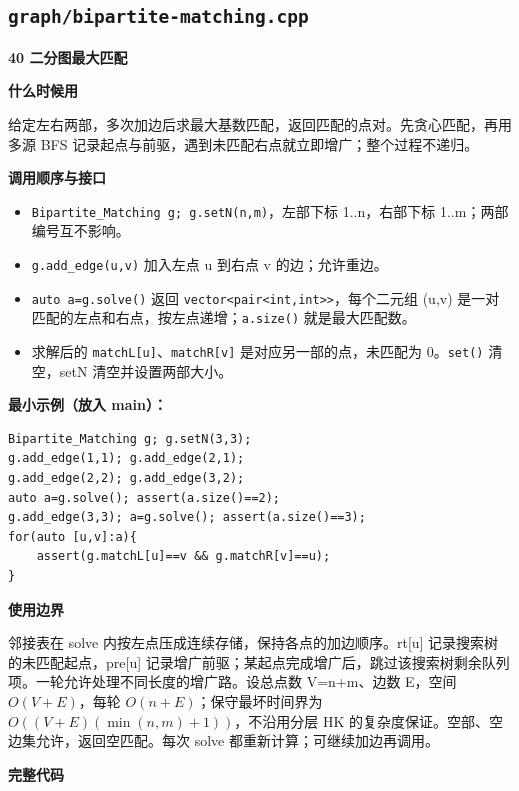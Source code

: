 \documentclass[UTF8,a4paper,10pt]{ctexart}
\newcommand{\TemplUsage}[1]{\textbf{什么时候用}\par #1\par}
\newcommand{\TemplApi}[1]{\textbf{调用顺序与接口}\par #1\par}
\newcommand{\TemplNote}[1]{\textbf{使用边界}\par #1\par}
\begin{document}
\subsection{\texttt{graph/bipartite-matching.cpp}}
\textbf{40 二分图最大匹配}

\TemplUsage{给定左右两部，多次加边后求最大基数匹配，返回匹配的点对。先贪心匹配，再用多源 BFS 记录起点与前驱，遇到未匹配右点就立即增广；整个过程不递归。}
\TemplApi{\begin{itemize}
\item \texttt{Bipartite\_Matching g; g.setN(n,m)}，左部下标 1..n，右部下标 1..m；两部编号互不影响。
\item \texttt{g.add\_edge(u,v)} 加入左点 u 到右点 v 的边；允许重边。
\item \texttt{auto a=g.solve()} 返回 \texttt{vector<pair<int,int>>}，每个二元组 (u,v) 是一对匹配的左点和右点，按左点递增；\texttt{a.size()} 就是最大匹配数。
\item 求解后的 \texttt{matchL[u]}、\texttt{matchR[v]} 是对应另一部的点，未匹配为 0。\texttt{set()} 清空，setN 清空并设置两部大小。
\end{itemize}}
\textbf{最小示例（放入 main）：}
\begin{lstlisting}
Bipartite_Matching g; g.setN(3,3);
g.add_edge(1,1); g.add_edge(2,1);
g.add_edge(2,2); g.add_edge(3,2);
auto a=g.solve(); assert(a.size()==2);
g.add_edge(3,3); a=g.solve(); assert(a.size()==3);
for(auto [u,v]:a){
    assert(g.matchL[u]==v && g.matchR[v]==u);
}
\end{lstlisting}
\TemplNote{邻接表在 solve 内按左点压成连续存储，保持各点的加边顺序。rt[u] 记录搜索树的未匹配起点，pre[u] 记录增广前驱；某起点完成增广后，跳过该搜索树剩余队列项。一轮允许处理不同长度的增广路。设总点数 V=n+m、边数 E，空间 $O(V+E)$，每轮 $O(n+E)$；保守最坏时间界为 $O((V+E)(\min(n,m)+1))$，不沿用分层 HK 的复杂度保证。空部、空边集允许，返回空匹配。每次 solve 都重新计算；可继续加边再调用。}
\textbf{完整代码}
\end{document}
